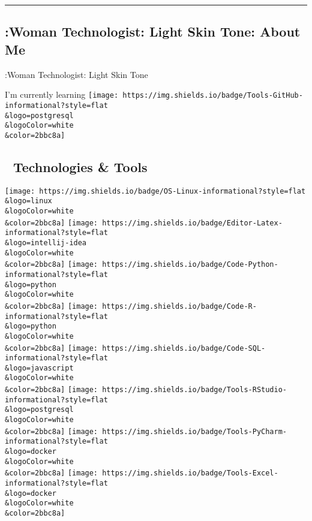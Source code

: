 \documentclass[
]{article}
\author{}
\date{\vspace{-2.5em}}
\begin{document}
\leavevmode{}%

\leavevmode{}%

\begin{center}\rule{0.5\linewidth}{0.5pt}\end{center}

\hypertarget{woman-technologist-light-skin-tone-about-me}{%
\subsection{:Woman Technologist: Light Skin Tone: About
Me}\label{woman-technologist-light-skin-tone-about-me}}

:Woman Technologist: Light Skin Tone

I'm currently learning
\texttt{[image: https://img.shields.io/badge/Tools-GitHub-informational?style=flat\\\&logo=postgresql\\\&logoColor=white\\\&color=2bbc8a]}

\hypertarget{technologies-tools}{%
\subsection{🔧 Technologies \& Tools}\label{technologies-tools}}

\texttt{[image: https://img.shields.io/badge/OS-Linux-informational?style=flat\\\&logo=linux\\\&logoColor=white\\\&color=2bbc8a]}
\texttt{[image: https://img.shields.io/badge/Editor-Latex-informational?style=flat\\\&logo=intellij-idea\\\&logoColor=white\\\&color=2bbc8a]}
\texttt{[image: https://img.shields.io/badge/Code-Python-informational?style=flat\\\&logo=python\\\&logoColor=white\\\&color=2bbc8a]}
\texttt{[image: https://img.shields.io/badge/Code-R-informational?style=flat\\\&logo=python\\\&logoColor=white\\\&color=2bbc8a]}
\texttt{[image: https://img.shields.io/badge/Code-SQL-informational?style=flat\\\&logo=javascript\\\&logoColor=white\\\&color=2bbc8a]}
\texttt{[image: https://img.shields.io/badge/Tools-RStudio-informational?style=flat\\\&logo=postgresql\\\&logoColor=white\\\&color=2bbc8a]}
\texttt{[image: https://img.shields.io/badge/Tools-PyCharm-informational?style=flat\\\&logo=docker\\\&logoColor=white\\\&color=2bbc8a]}
\texttt{[image: https://img.shields.io/badge/Tools-Excel-informational?style=flat\\\&logo=docker\\\&logoColor=white\\\&color=2bbc8a]}
\end{document}

